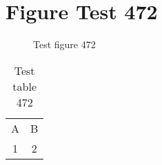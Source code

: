 \documentclass{article}
\begin{document}
\section{Figure Test 472}
\begin{figure}[h]
\caption{Test figure 472}
\end{figure}
\begin{table}[h]
\caption{Test table 472}
\begin{tabular}{cc}
A & B \\
1 & 2
\end{tabular}
\end{table}
\end{document}
